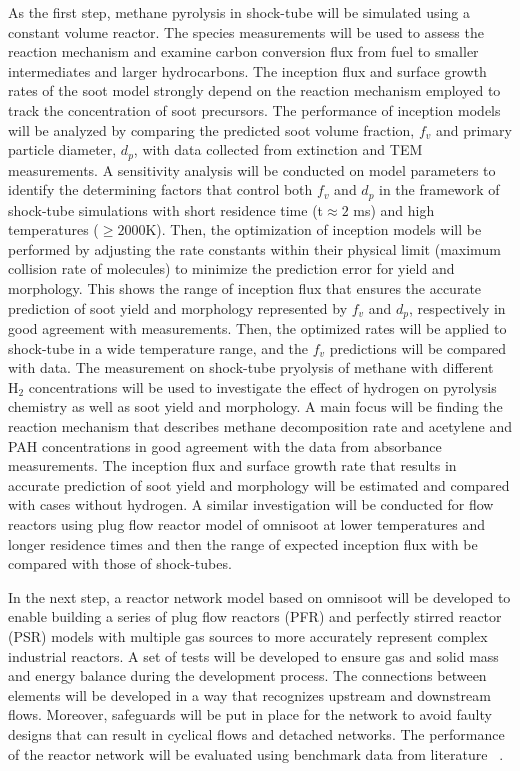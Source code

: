   
As the first step, methane pyrolysis in shock-tube will be simulated using a constant volume reactor. The species measurements will be used to assess the reaction mechanism and examine carbon conversion flux from fuel to smaller intermediates and larger hydrocarbons. The inception flux and surface growth rates of the soot model strongly depend on the reaction mechanism employed to track the concentration of soot precursors. The performance of inception models will be analyzed by comparing the predicted soot volume fraction, $f_v$ and primary particle diameter, $d_p$, with data collected from extinction and TEM measurements. A sensitivity analysis will be conducted on model parameters to identify the determining factors that control both $f_v$ and $d_p$ in the framework of shock-tube simulations with short residence time (t$\approx2$ ms) and high temperatures ($\ge 2000$K). Then, the optimization of inception models will be performed by adjusting the rate constants within their physical limit (maximum collision rate of molecules) to minimize the prediction error for yield and morphology. This shows the range of inception flux that ensures the accurate prediction of soot yield and morphology represented by $f_v$ and $d_p$, respectively in good agreement with measurements. Then, the optimized rates will be applied to shock-tube in a wide temperature range, and the $f_v$ predictions will be compared with data. The measurement on shock-tube pryolysis of methane with different $\mathrm{H_2}$ concentrations will be used to investigate the effect of hydrogen on pyrolysis chemistry as well as soot yield and morphology. A main focus will be finding the reaction mechanism that describes methane decomposition rate and acetylene and PAH concentrations in good agreement with the data from absorbance measurements. The inception flux and surface growth rate that results in accurate prediction of soot yield and morphology will be estimated and compared with cases without hydrogen. A similar investigation will be conducted for flow reactors using plug flow reactor model of omnisoot at lower temperatures and longer residence times and then the range of expected inception flux with be compared with those of shock-tubes.

In the next step, a reactor network model based on omnisoot will be developed to enable building a series of  plug flow reactors (PFR) and  perfectly stirred reactor (PSR) models with multiple gas sources to more accurately represent complex industrial reactors. A set of tests will be developed to ensure gas and solid mass and energy balance during the development process. The connections between elements will be developed in a way that recognizes upstream and downstream flows. Moreover, safeguards will be put in place for the network to avoid faulty designs that can result in cyclical flows and detached networks. The performance of the reactor network will be evaluated using benchmark data from literature ~\citep{manzello2007soot}. 

